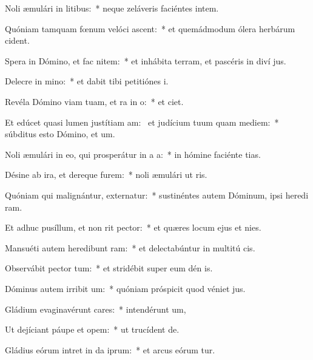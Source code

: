 \item Noli æmulári in litibus:~* neque zeláveris faciéntes intem.
\item Quóniam tamquam fœnum velóci ascent:~* et quemádmodum ólera herbárum  cident.
\item Spera in Dómino, et fac nitem:~* et inhábita terram, et pascéris in diví jus.
\item Delecre in mino:~* et dabit tibi petitiónes  i.
\item Revéla Dómino viam tuam, et ra in o:~* et  ciet.
\item Et edúcet quasi lumen justítiam am:~\pscross{} et judícium tuum quam mediem:~* súbditus esto Dómino, et  um.
\item Noli æmulári in eo, qui prosperátur in a a:~* in hómine faciénte tias.
\item Désine ab ira, et dereque furem:~* noli æmulári ut ris.
\item Quóniam qui malignántur, externatur:~* sustinéntes autem Dóminum, ipsi heredi ram.
\item Et adhuc pusíllum, et non rit pector:~* et quæres locum ejus et  nies.
\item Mansuéti autem heredibunt ram:~* et delectabúntur in multitú cis.
\item Observábit pector tum:~* et stridébit super eum dén is.
\item Dóminus autem irribit um:~* quóniam próspicit quod véniet  jus.
\item Gládium evaginavérunt cares:~* intendérunt  um,
\item Ut dejíciant páupe et opem:~* ut trucídent  de.
\item Gládius eórum intret in da iprum:~* et arcus eórum tur.
